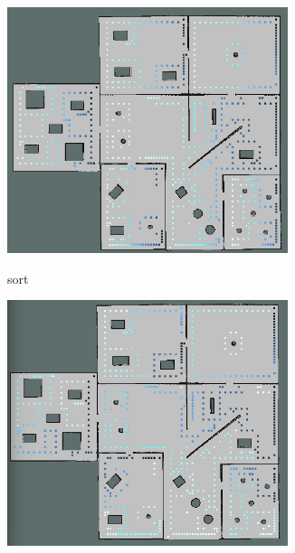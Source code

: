 \begin{figure}[!htb]
     \centering
     \begin{subfigure}[b]{0.5\textwidth}
         \centering
         \includegraphics[width=0.9\textwidth]{./images/chapter5/wf_optimization_1_sorted.png}
         \label{fig:wf_optimization_1_sorted}
         \caption{sort}
     \end{subfigure}%
     \begin{subfigure}[b]{0.5\textwidth}
         \centering
         \includegraphics[width=0.9\textwidth]{./images/chapter5/wf_optimization_2_stepHC.png}
         \label{fig:wf_optimization_2_stepHC}

\end{subfigure}
\end{figure}
